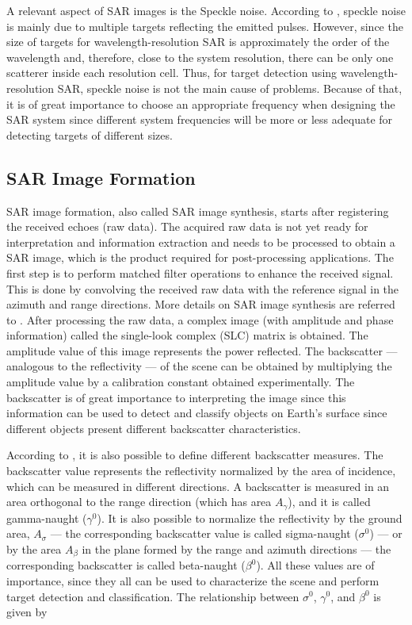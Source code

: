 A relevant aspect of SAR images is the Speckle noise. According to \cite{63, 17}, speckle noise is mainly due to multiple targets reflecting the emitted pulses. However, since the size of targets for wavelength-resolution SAR is approximately the order of the wavelength and, therefore, close to the system resolution, there can be only one scatterer inside each resolution cell. Thus, for target detection using wavelength-resolution SAR, speckle noise is not the main cause of problems. Because of that, it is of great importance to choose an appropriate frequency when designing the SAR system since different system frequencies will be more or less adequate for detecting targets of different sizes.


\subsection{SAR Image Formation}
SAR image formation, also called SAR image synthesis, starts after registering the received echoes (raw data). The acquired raw data is not yet ready for interpretation and information extraction \cite{Alberto} and needs to be processed to obtain a SAR image, which is the product required for post-processing applications. The first step is to perform matched filter operations to enhance the received signal. This is done by convolving the received raw data with the reference signal in the azimuth and range directions. More details on SAR image synthesis are referred to \cite{Alberto, livro}. After processing the raw data, a complex image (with amplitude and phase information) called the single-look complex (SLC) matrix is obtained. The amplitude value of this image represents the power reflected. The backscatter --- analogous to the reflectivity --- of the scene can be obtained by multiplying the amplitude value by a calibration constant obtained experimentally. The backscatter is of great importance to interpreting the image since this information can be used to detect and classify objects on Earth's surface \cite{radiometric} since different objects present different backscatter characteristics.

According to \cite{Raney,Small}, it is also possible to define different backscatter measures. The backscatter value represents the reflectivity normalized by the area of incidence, which can be measured in different directions. A backscatter is measured in an area orthogonal to the range direction (which has area $A_\gamma$), and it is called gamma-naught ($\gamma^0$). It is also possible to normalize the reflectivity by the ground area, $A_\sigma$ --- the corresponding backscatter value is called sigma-naught ($\sigma^0$) --- or by the area $A_\beta$ in the plane formed by the range and azimuth directions --- the corresponding backscatter is called beta-naught ($\beta^0$). All these values are of importance, since they all can be used to characterize the scene and perform target detection and classification. The relationship between $\sigma^0$, $\gamma^0$, and $\beta^0$ is given by

